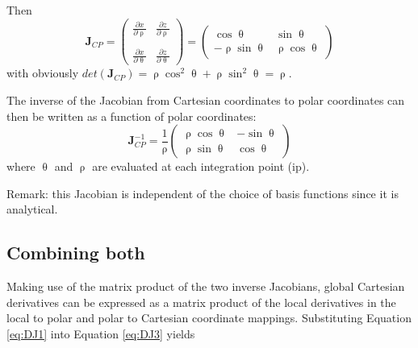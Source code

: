 Then 
\[
{\bm J}_{CP}=
\left(
\begin{array}{cc}
\frac{\partial x}{\partial \uprho}   & 
\frac{\partial z}{\partial \uprho} \\ \\ 
\frac{\partial x}{\partial \uptheta}  & 
\frac{\partial z}{\partial \uptheta}  
\end{array}
\right)
=
\left(
\begin{array}{cc}
\cos \uptheta & \sin \uptheta \\
 -\uprho \sin \uptheta  & \uprho \cos \uptheta 
\end{array}
\right)
\]
with obviously $det({\bm J}_{CP})=\uprho \cos^2 \uptheta+ \uprho \sin^2 \uptheta = \uprho$.

The inverse of the Jacobian from Cartesian coordinates to polar coordinates can then be written 
as a function of polar coordinates:
\begin{equation}
\boxed{
{\bm J}_{CP}^{-1} 
= 
\frac{1}{\uprho}
\left(
\begin{array}{cc}
\uprho\cos\uptheta & -\sin\uptheta \\
\uprho\sin\uptheta & \cos\uptheta
\end{array}
\right)}
\label{eq:DJ6}
\end{equation}
where $\uptheta$ and $\uprho$ are evaluated at each integration point (ip).

Remark: this Jacobian is independent of the choice of basis functions since it is analytical.

\subsection{Combining both}

Making use of the matrix product of the two inverse Jacobians,
global Cartesian derivatives can be expressed as a matrix product of the local 
derivatives in the local to polar and polar to Cartesian coordinate mappings. 
Substituting Equation \eqref{eq:DJ1} into Equation \eqref{eq:DJ3} yields

